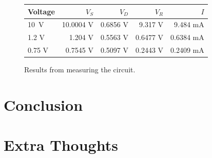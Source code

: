 \documentclass{../../ece-report}
\begin{document}
\begin{figure}[h!]
  \centering
  \begin{tabular}{lrrrr}\toprule
    Voltage & $V_S$      & $V_D$    & $V_R$    & $I$ \\ \midrule
    10~V    & 10.0004 V  & 0.6856 V & 9.317  V & 9.484  mA \\
    1.2 V   & 1.204   V  & 0.5563 V & 0.6477 V & 0.6384 mA \\
    0.75 V  & 0.7545  V  & 0.5097 V & 0.2443 V & 0.2409 mA \\
    \bottomrule
  \end{tabular}
  \caption{Results from measuring the circuit.}
  \label{tab:results}
\end{figure}

\section{Conclusion}

\section{Extra Thoughts}
\end{document}
